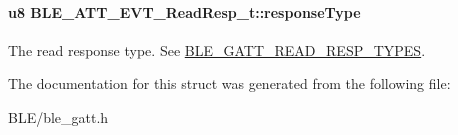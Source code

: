 \paragraph[{\texorpdfstring{response\+Type}{responseType}}]{\setlength{\rightskip}{0pt plus 5cm}u8 B\+L\+E\+\_\+\+A\+T\+T\+\_\+\+E\+V\+T\+\_\+\+Read\+Resp\+\_\+t\+::response\+Type}\hypertarget{struct_b_l_e___a_t_t___e_v_t___read_resp__t_adb39650d43cdd5856fe20a70c857f55d}{}\label{struct_b_l_e___a_t_t___e_v_t___read_resp__t_adb39650d43cdd5856fe20a70c857f55d}
The read response type. See \hyperlink{group___b_l_e___g_a_t_t___r_e_a_d___r_e_s_p___t_y_p_e_s}{B\+L\+E\+\_\+\+G\+A\+T\+T\+\_\+\+R\+E\+A\+D\+\_\+\+R\+E\+S\+P\+\_\+\+T\+Y\+P\+ES}. 

The documentation for this struct was generated from the following file\+:\begin{DoxyCompactItemize}
\item 
B\+L\+E/ble\+\_\+gatt.\+h\end{DoxyCompactItemize}
